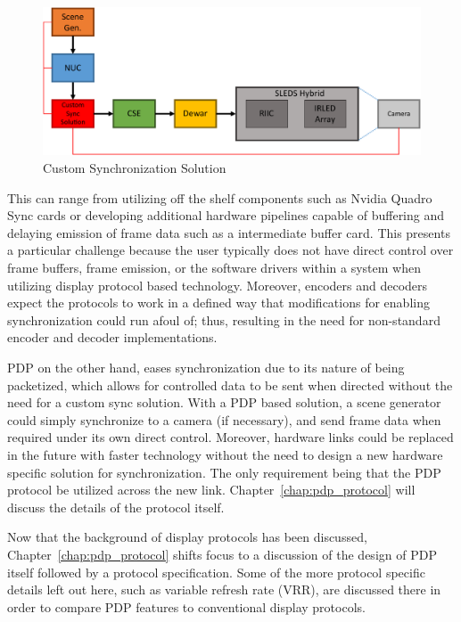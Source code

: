     \begin{figure}
        \centering
        \includegraphics[width=1.0\textwidth]{fig/custom_sync.pdf}
        \caption{Custom Synchronization Solution}
        \label{fig:custom_sync}
    \end{figure}

    This can range from utilizing off the shelf components such as Nvidia Quadro Sync cards\cite{NVIDIA2020_2} or developing additional hardware pipelines capable of buffering and delaying emission of frame data such as a intermediate buffer card. This presents a particular challenge because the user typically does not have direct control over frame buffers, frame emission, or the software drivers within a system when utilizing display protocol based technology. Moreover, encoders and decoders expect the protocols to work in a defined way that modifications for enabling synchronization could run afoul of; thus, resulting in the need for non-standard encoder and decoder implementations.

    PDP on the other hand, eases synchronization due to its nature of being packetized, which allows for controlled data to be sent when directed without the need for a custom sync solution. With a PDP based solution, a scene generator could simply synchronize to a camera (if necessary), and send frame data when required under its own direct control. Moreover, hardware links could be replaced in the future with faster technology without the need to design a new hardware specific solution for synchronization. The only requirement being that the PDP protocol be utilized across the new link. Chapter~\ref{chap:pdp_protocol} will discuss the details of the protocol itself.

    Now that the background of display protocols has been discussed, Chapter~\ref{chap:pdp_protocol} shifts focus to a discussion of the design of PDP itself followed by a protocol specification. Some of the more protocol specific details left out here, such as variable refresh rate (VRR), are discussed there in order to compare PDP features to conventional display protocols.
